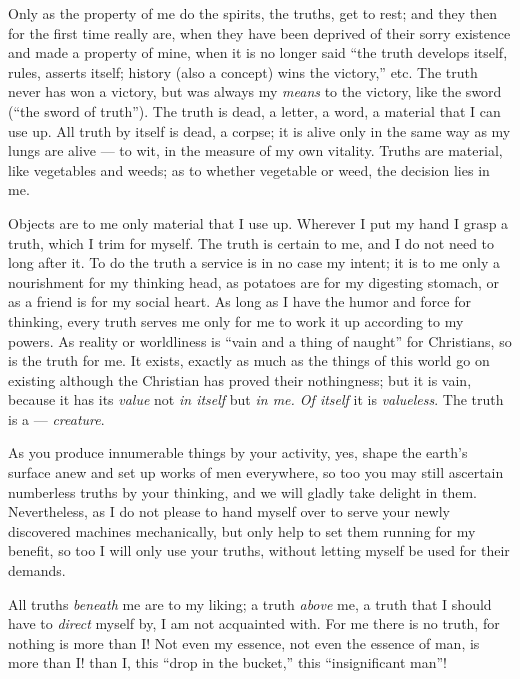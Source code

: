 Only as the property of me do the spirits, the truths, get to rest; and they 
then for the first time really are, when they have been deprived of their 
sorry existence and made a property of mine, when it is no longer said ``the 
truth develops itself, rules, asserts itself; history (also a concept) wins 
the victory,'' etc. The truth never has won a victory, but was always my 
\textit{means} to the victory, like the sword (``the sword of truth''). The 
truth is dead, a letter, a word, a material that I can use up. All truth by 
itself is dead, a corpse; it is alive only in the same way as my lungs are 
alive --- to wit, in the measure of my own vitality. Truths are material, like 
vegetables and weeds; as to whether vegetable or weed, the decision lies in 
me.

Objects are to me only material that I use up. Wherever I put my hand I grasp 
a truth, which I trim for myself. The truth is certain to me, and I do not 
need to long after it. To do the truth a service is in no case my intent; it 
is to me only a nourishment for my thinking head, as potatoes are for my 
digesting stomach, or as a friend is for my social heart. As long as I have 
the humor and force for thinking, every truth serves me only for me to work it 
up according to my powers. As reality or worldliness is ``vain and a thing of 
naught'' for Christians, so is the truth for me. It exists, exactly as much 
as the things of this world go on existing although the Christian has proved 
their nothingness; but it is vain, because it has its \textit{value} not 
\textit{in itself} but \textit{in me. Of itself} it is \textit{valueless}. The 
truth is a --- \textit{creature}.

As you produce innumerable things by your activity, yes, shape the earth's 
surface anew and set up works of men everywhere, so too you may still 
ascertain numberless truths by your thinking, and we will gladly take delight 
in them. Nevertheless, as I do not please to hand myself over to serve your 
newly discovered machines mechanically, but only help to set them running for 
my benefit, so too I will only use your truths, without letting myself be used 
for their demands.

All truths \textit{beneath} me are to my liking; a truth \textit{above} me, a 
truth that I should have to \textit{direct} myself by, I am not acquainted 
with. For me there is no truth, for nothing is more than I! Not even my 
essence, not even the essence of man, is more than I! than I, this ``drop in 
the bucket,'' this ``insignificant man''!

